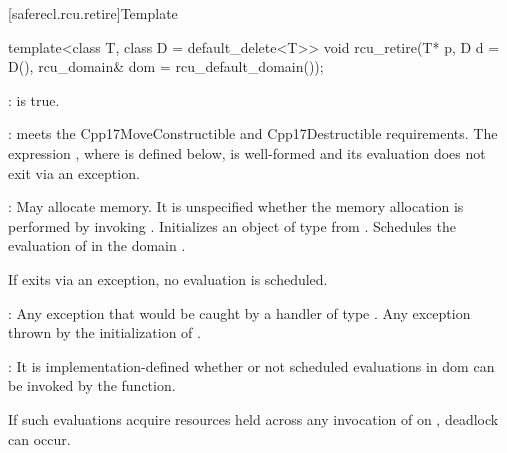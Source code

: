 [saferecl.rcu.retire]{Template }

\begin{itemdecl}
template<class T, class D = default_delete<T>>
void rcu_retire(T* p, D d = D(), rcu_domain& dom = rcu_default_domain());
\end{itemdecl}

\begin{itemdescr}

\pnum
{}:  is true.

\pnum
{}:  meets the Cpp17MoveConstructible and
Cpp17Destructible requirements.
The expression , where  is defined below, is
well-formed and its evaluation does not exit via an exception.

\pnum
{}: May allocate memory.
It is unspecified whether the memory allocation is performed by
invoking  .
Initializes an object  of type  from
.
Schedules the evaluation of  in the domain
.
\begin{note}
If  exits via an exception, no evaluation
is scheduled.
\end{note}

\pnum
{}: Any exception that would be caught by a handler of type
.
Any exception thrown by the initialization of .

\pnum
{}: It is implementation-defined whether or not scheduled
evaluations in dom can be invoked by the 
function.
\begin{note}
If such evaluations acquire resources held across any invocation
of  on , deadlock can occur.
\end{note}

\end{itemdescr}
